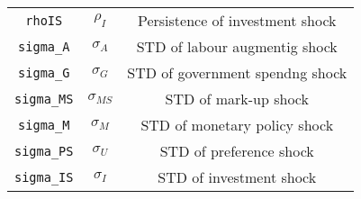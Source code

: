 \begin{center}
\begin{longtable}{ccc}
\texttt{rhoIS} & ${\rho_{I}}$ & Persistence of investment shock\\
\texttt{sigma\_A} & ${\sigma_{A}}$ & STD of labour augmentig shock\\
\texttt{sigma\_G} & ${\sigma_{G}}$ & STD of government spendng shock\\
\texttt{sigma\_MS} & ${\sigma_{MS}}$ & STD of mark-up shock\\
\texttt{sigma\_M} & ${\sigma_{M}}$ & STD of monetary policy shock\\
\texttt{sigma\_PS} & ${\sigma_{U}}$ & STD of preference shock\\
\texttt{sigma\_IS} & ${\sigma_{I}}$ & STD of investment shock\\
\hline%
\end{longtable}
\end{center}
